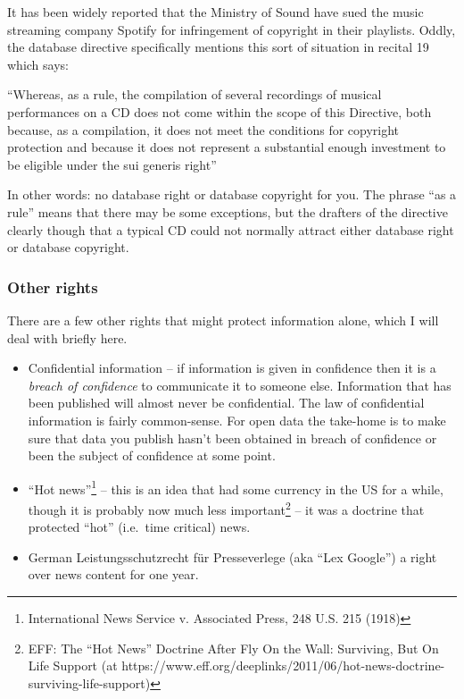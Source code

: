 It has been widely reported that the Ministry of Sound have sued the
music streaming company Spotify for infringement of copyright in their
playlists. Oddly, the database directive specifically mentions this sort
of situation in recital 19 which says:

``Whereas, as a rule, the compilation of several recordings of musical
performances on a CD does not come within the scope of this Directive,
both because, as a compilation, it does not meet the conditions for
copyright protection and because it does not represent a substantial
enough investment to be eligible under the sui generis right''

In other words: no database right or database copyright for you. The
phrase ``as a rule'' means that there may be some exceptions, but the
drafters of the directive clearly though that a typical CD could not
normally attract either database right or database copyright.

\subsubsection{Other rights}\label{other-rights}

There are a few other rights that might protect information alone, which
I will deal with briefly here.

\begin{itemize}
\item
  Confidential information -- if information is given in confidence then
  it is a \emph{breach of confidence} to communicate it to someone else.
  Information that has been published will almost never be confidential.
  The law of confidential information is fairly common-sense. For open
  data the take-home is to make sure that data you publish hasn't been
  obtained in breach of confidence or been the subject of confidence at
  some point.
\item
  ``Hot news''\footnote{International News Service v. Associated Press,
    248 U.S. 215 (1918)} -- this is an idea that had some currency in
  the US for a while, though it is probably now much less
  important\footnote{EFF: The ``Hot News'' Doctrine After Fly On the
    Wall: Surviving, But On Life Support (at
    https://www.eff.org/deeplinks/2011/06/hot-news-doctrine-surviving-life-support)}
  -- it was a doctrine that protected ``hot'' (i.e.~time critical) news.
\item
  German Leistungsschutzrecht für Presseverlege (aka ``Lex Google'') a
  right over news content for one year.
\end{itemize}

